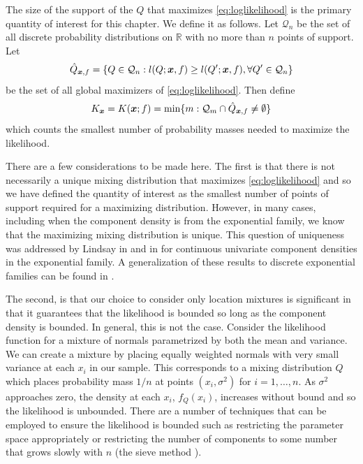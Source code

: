	The size of the support of the $Q$ that maximizes \eqref{eq:loglikelihood} is the primary quantity of interest for this chapter. We define it as follows. Let $\mathcal{Q}_n$ be the set of all discrete probability distributions on $\mathbb{R}$ with no more than $n$ points of support. Let
	\begin{equation}
		\hat{Q}_{{\bm{{x}}},f} = \{Q \in \mathcal{Q}_n: l(Q;{\bm{{x}}},f) \geq l(Q';{\bm{{x}}},f), \forall Q' \in \mathcal{Q}_n\}
	\end{equation}
	be the set of all global maximizers of \eqref{eq:loglikelihood}. Then define
	\begin{equation}
		K_{\bm{{x}}} = K({\bm{{x}}}; f) = \min\{m : \mathcal{Q}_m \cap \hat{Q}_{{\bm{{x}}},f} \neq \emptyset\}
		\label{eq:K_x definition}
	\end{equation}
	which counts the smallest number of probability masses needed to maximize the likelihood.


	There are a few considerations to be made here. The first is that there is not necessarily a unique mixing distribution that maximizes \eqref{eq:loglikelihood} and so we have defined the quantity of interest as the smallest number of points of support required for a maximizing distribution. However, in many cases, including when the component density is from the exponential family, we know that the maximizing mixing distribution is unique. This question of uniqueness was addressed by Lindsay in \cite{Lindsay1983-tf} and in \cite{Lindsay1983a-he} for continuous univariate component densities in the exponential family. A generalization of these results to discrete exponential families can be found in \cite{Lindsay1993-rj}.

	The second, is that our choice to consider only location mixtures is significant in that it guarantees that the likelihood is bounded so long as the component density is bounded. In general, this is not the case. Consider the likelihood function for a mixture of normals parametrized by both the mean and variance. We can create a mixture by placing equally weighted normals with very small variance at each $x_i$ in our sample. This corresponds to a mixing distribution $Q$ which places probability mass $1/n$ at points $(x_i, \sigma^2)$ for $i = 1, \dots, n$. As $\sigma^2$ approaches zero, the density at each $x_i$, $f_Q(x_i)$, increases without bound and so the likelihood is unbounded. There are a number of techniques that can be employed to ensure the likelihood is bounded such as restricting the parameter space appropriately or restricting the number of components to some number that grows slowly with $n$ (the sieve method \cite{Grenander1981-dy}).

